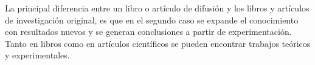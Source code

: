 \documentclass[12pt]{article}
\begin{document}
\vspace{1cm}

\begin{center}
\begin{minipage}[c]{1\textwidth}
\end{minipage}
\end{center}

La principal diferencia entre un libro o artículo de difusión y los libros y artículos de investigación original, es que en el segundo caso se expande el conocimiento con resultados nuevos y se generan conclusiones a partir de experimentación. Tanto en libros como en artículos científicos se pueden encontrar trabajos teóricos y experimentales. 
\end{document}
